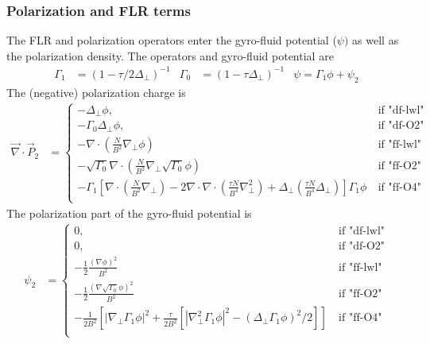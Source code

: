 \subsubsection{Polarization and FLR terms}
\label{sec:polarization}
The FLR and polarization operators enter the gyro-fluid potential (\(\psi)\) as well as the polarization density.
The operators and gyro-fluid potential are
\begin{align}
 \Gamma_1 &= ( 1- \tau/2 \Delta_{\perp})^{-1} &
 \Gamma_0 &= ( 1- \tau\Delta_{\perp})^{-1} &
   \psi = \Gamma_1 \phi + \psi_2 
\end{align}
The  (negative) polarization charge is 
\begin{align}
  \vec{\nabla}\cdot \vec{P}_2 &=    
\begin{cases}
-\Delta_{\perp} \phi , 
        &\ \text{if "df-lwl"} \\
-\Gamma_0\Delta_{\perp} \phi, 
      &\ \text{if "df-O2"} \\
-\nabla\cdot \left(\frac{N}{B^2} \nabla_\perp \phi\right)
       &\ \text{if "ff-lwl"} \\
-\sqrt{\Gamma_0}\nabla\cdot \left(\frac{N}{B^2} \nabla_\perp\sqrt{\Gamma_0} \phi\right) 
         &\ \text{if "ff-O2"} \\
-\Gamma_1 \left[\nabla\cdot \left(\frac{N}{B^2} \nabla_\perp\right)-2   \nabla\cdot\nabla\cdot \left(\frac{\tau N}{B^4} \nabla_\perp^2\right)+  \Delta_{\perp} \left(\frac{\tau N}{B^4} \Delta_{\perp}\right)\right]\Gamma_1 \phi 
        &\ \text{if "ff-O4"} \\
\end{cases}
\end{align}
The polarization part of the gyro-fluid potential is
\begin{align}
\psi_2&=    
\begin{cases}
0 , 
        &\ \text{if "df-lwl"} \\
0, 
      &\ \text{if "df-O2"} \\
- \frac{1}{2} \frac{(\nabla\phi)^2}{B^2}
       &\ \text{if "ff-lwl"} \\
- \frac{1}{2} \frac{(\nabla\sqrt{\Gamma_0}\phi)^2}{B^2}
         &\ \text{if "ff-O2"} \\
- \frac{1}{2 B^2} \left[|\nabla_\perp \Gamma_1\phi|^2 + \frac{\tau}{2 B^2} \left[|\nabla_\perp^2 \Gamma_1\phi |^2 - (\Delta_{\perp} \Gamma_1\phi)^2 /2 \right]\right]
        &\ \text{if "ff-O4"} \\
\end{cases}
\end{align}
